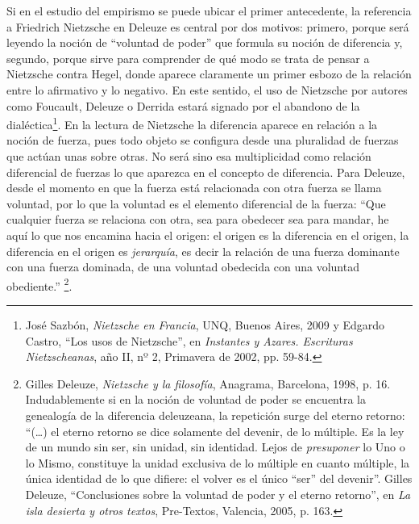 \documentclass{book}
\begin{document}
Si en el estudio del empirismo se puede ubicar el primer antecedente, la
referencia a Friedrich Nietzsche en Deleuze es central por dos motivos:
primero, porque será leyendo la noción de \enquote{voluntad de poder} que
formula su noción de diferencia y, segundo, porque sirve para comprender
de qué modo se trata de pensar a Nietzsche contra Hegel, donde aparece
claramente un primer esbozo de la relación entre lo afirmativo y lo
negativo. En este sentido, el uso de Nietzsche por autores como
Foucault, Deleuze o Derrida estará signado por el abandono de la
dialéctica\footnote{José Sazbón, \emph{Nietzsche en Francia}, UNQ,
  Buenos Aires, 2009 y Edgardo Castro, \enquote{Los usos de Nietzsche}, en
  \emph{Instantes y Azares. Escrituras Nietzscheanas}, año II, nº 2,
  Primavera de 2002, pp. 59-84.}. En la lectura de Nietzsche la
diferencia aparece en relación a la noción de fuerza, pues todo objeto
se configura desde una pluralidad de fuerzas que actúan unas sobre
otras. No será sino esa multiplicidad como relación diferencial de
fuerzas lo que aparezca en el concepto de diferencia. Para Deleuze,
desde el momento en que la fuerza está relacionada con otra fuerza se
llama voluntad, por lo que la voluntad es el elemento diferencial de la
fuerza: \enquote{Que cualquier fuerza se relaciona con otra, sea para obedecer
sea para mandar, he aquí lo que nos encamina hacia el origen: el origen
es la diferencia en el origen, la diferencia en el origen es
\emph{jerarquía}, es decir la relación de una fuerza dominante con una
fuerza dominada, de una voluntad obedecida con una voluntad
obediente.} \footnote{Gilles Deleuze, \emph{Nietzsche y la filosofía},
  Anagrama, Barcelona, 1998, p. 16. Indudablemente si en la noción de
  voluntad de poder se encuentra la genealogía de la diferencia
  deleuzeana, la repetición surge del eterno retorno: \enquote{(\dots) el
  eterno retorno se dice solamente del devenir, de lo múltiple. Es la
  ley de un mundo sin ser, sin unidad, sin identidad. Lejos de
  \emph{presuponer} lo Uno o lo Mismo, constituye la unidad exclusiva de
  lo múltiple en cuanto múltiple, la única identidad de lo que difiere:
  el volver es el único ``ser'' del devenir}. Gilles Deleuze,
  \enquote{Conclusiones sobre la voluntad de poder y el eterno retorno}, en
  \emph{La isla desierta y otros textos}, Pre-Textos, Valencia, 2005, p.
  163.}.
\end{document}
